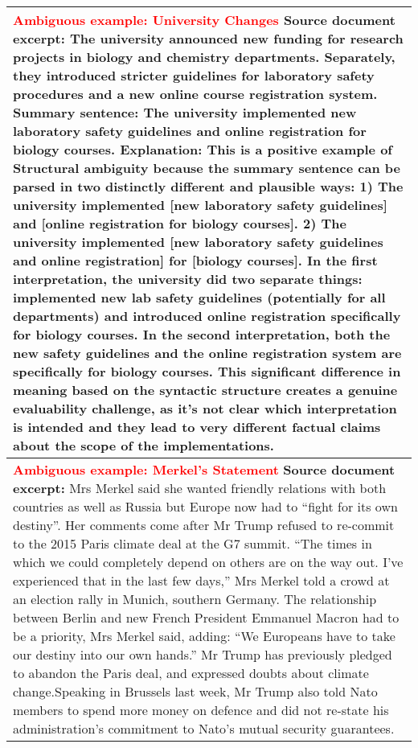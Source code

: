 \begin{table*}
\centering
\small
\begin{tabular}{@{}p{14cm}@{}}
\toprule
\textbf{\textcolor{red}{Ambiguous example: University Changes}}
\newline
\textbf{Source document excerpt:}
The university announced new funding for research projects in biology and chemistry departments. Separately, they introduced stricter guidelines for laboratory safety procedures and a new online course registration system.
\newline
\textbf{Summary sentence:}
The university implemented new laboratory safety guidelines and online registration for biology courses.
\newline
\textbf{Explanation:}
This is a positive example of Structural ambiguity because the summary sentence can be parsed in two distinctly different and plausible ways: 1) The university implemented [new laboratory safety guidelines] and [online registration for biology courses]. 2) The university implemented [new laboratory safety guidelines and online registration] for [biology courses]. In the first interpretation, the university did two separate things: implemented new lab safety guidelines (potentially for all departments) and introduced online registration specifically for biology courses. In the second interpretation, both the new safety guidelines and the online registration system are specifically for biology courses. This significant difference in meaning based on the syntactic structure creates a genuine evaluability challenge, as it’s not clear which interpretation is intended and they lead to very different factual claims about the scope of the implementations.
\\
\midrule
\textbf{\textcolor{red}{Ambiguous example: Merkel’s Statement}}
\newline
\textbf{Source document excerpt:}
Mrs Merkel said she wanted friendly relations with both countries as well as Russia but Europe now had to “fight for its own destiny”. Her comments come after Mr Trump refused to re-commit to the 2015 Paris climate deal at the G7 summit. “The times in which we could completely depend on others are on the way out. I’ve experienced that in the last few days,” Mrs Merkel told a crowd at an election rally in Munich, southern Germany. The relationship between Berlin and new French President Emmanuel Macron had to be a priority, Mrs Merkel said, adding: “We Europeans have to take our destiny into our own hands.” Mr Trump has previously pledged to abandon the Paris deal, and expressed doubts about climate change.Speaking in Brussels last week, Mr Trump also told Nato members to spend more money on defence and did not re-state his administration’s commitment to Nato’s mutual security guarantees.

\end{tabular}
\end{table*}
